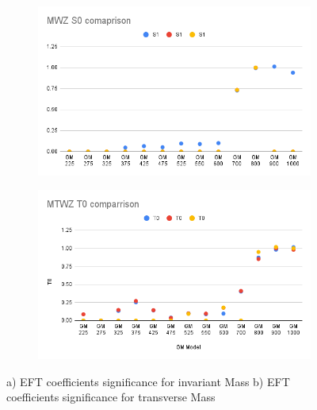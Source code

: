 \documentclass[../Bachelorarbeit.tex]{subfiles}
\begin{document}
\begin{figure}
    \centering
    \begin{subfigure}{0.45\textwidth}
        \includegraphics[width=\textwidth]{Plots/significans/MWZ S0 comaprison.png}
        \caption{}
    \end{subfigure}
    \begin{subfigure}{0.45\textwidth}
        \includegraphics[width=\textwidth]{Plots/significans/MTWZ T0 comparrison.png}
        \caption{}
    \end{subfigure}
    \caption{a) EFT coefficients significance for invariant Mass b) EFT coefficients significance for transverse Mass}
    \label{fig:corss-section-comparission}
\end{figure}
\end{document}

